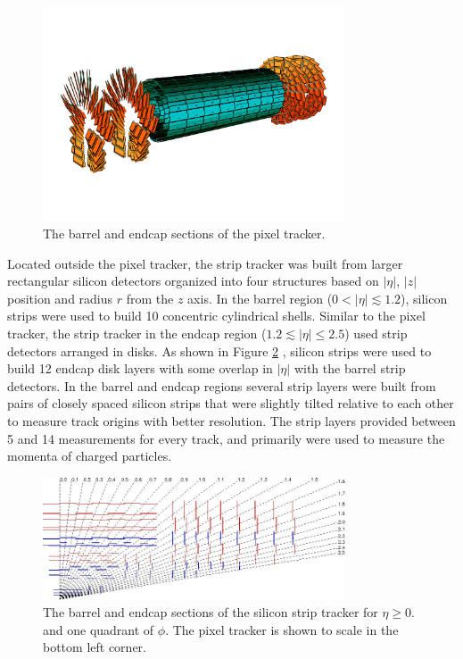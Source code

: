 \begin{figure}[ht]
	\centering
	\includegraphics[width=0.8\textwidth]{figures/pixelDetectorSchematic.png}
	\caption{The barrel and endcap sections of the pixel tracker.}
	\label{fig:pixelTracker}
\end{figure}

Located outside the pixel tracker, the strip tracker was built from larger rectangular silicon detectors 
organized into four structures based on $|\eta|$, $|z|$ position and radius $r$ from the $z$ axis.  In the barrel region 
($0 < |\eta| \lesssim 1.2$), silicon strips were used to build 10 concentric cylindrical shells.  Similar to the pixel tracker, the strip tracker in 
the endcap region ($1.2 \lesssim |\eta| \leq 2.5$) used strip detectors arranged in disks.  As shown in Figure \ref{fig:stripTracker} 
\cite{cmsTDR}, silicon strips were used to build 12 endcap disk layers with some overlap in $|\eta|$ with the 
barrel strip detectors.  In the barrel and endcap regions several strip layers were built from pairs of closely spaced 
silicon strips that were slightly tilted relative to each other to measure track origins with better resolution.  The 
strip layers provided between 5 and 14 measurements for every track, and primarily were used to measure the momenta 
of charged particles.

\begin{figure}[ht]
	\centering
	\includegraphics[width=0.8\textwidth]{figures/siliconStripAndPixelDetectorTwoDimView.png}
	\caption{The barrel and endcap sections of the silicon strip tracker for $\eta \geq 0.$ and one quadrant of $\phi$.  The pixel tracker is shown to scale in the bottom left corner.}
	\label{fig:stripTracker}
\end{figure}

